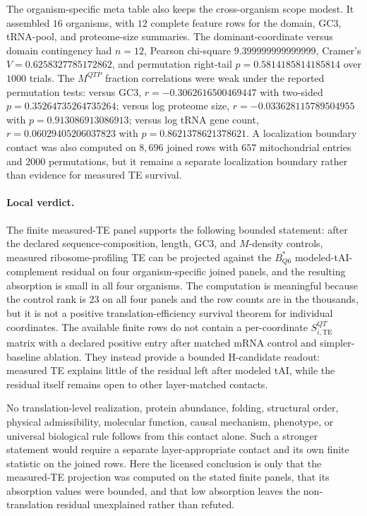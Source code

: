 The organism-specific meta table also keeps the cross-organism scope modest.  It assembled $16$ organisms, with $12$ complete feature rows for the domain, GC3, tRNA-pool, and proteome-size summaries.  The dominant-coordinate versus domain contingency had $n=12$, Pearson chi-square $9.399999999999999$, Cramer's $V=0.6258327785172862$, and permutation right-tail $p=0.5814185814185814$ over $1000$ trials.  The $M^{QTP}$ fraction correlations were weak under the reported permutation tests: versus GC3, $r=-0.3062616500469447$ with two-sided $p=0.35264735264735264$; versus log proteome size, $r=-0.033628115789504955$ with $p=0.913086913086913$; versus log tRNA gene count, $r=0.06029405206037823$ with $p=0.8621378621378621$.  A localization boundary contact was also computed on $8{,}696$ joined rows with $657$ mitochondrial entries and $2000$ permutations, but it remains a separate localization boundary rather than evidence for measured TE survival.

\paragraph{Local verdict.}
The finite measured-TE panel supports the following bounded statement: after the declared sequence-composition, length, GC3, and $M$-density controls, measured ribosome-profiling TE can be projected against the $B^*_{Q6}$ modeled-tAI-complement residual on four organism-specific joined panels, and the resulting absorption is small in all four organisms.  The computation is meaningful because the control rank is $23$ on all four panels and the row counts are in the thousands, but it is not a positive translation-efficiency survival theorem for individual coordinates.  The available finite rows do not contain a per-coordinate $S^{QT}_{i,\mathrm{TE}}$ matrix with a declared positive entry after matched mRNA control and simpler-baseline ablation.  They instead provide a bounded H-candidate readout: measured TE explains little of the residual left after modeled tAI, while the residual itself remains open to other layer-matched contacts.

No translation-level realization, protein abundance, folding, structural order, physical admissibility, molecular function, causal mechanism, phenotype, or universal biological rule follows from this contact alone.  Such a stronger statement would require a separate layer-appropriate contact and its own finite statistic on the joined rows.  Here the licensed conclusion is only that the measured-TE projection was computed on the stated finite panels, that its absorption values were bounded, and that low absorption leaves the non-translation residual unexplained rather than refuted.